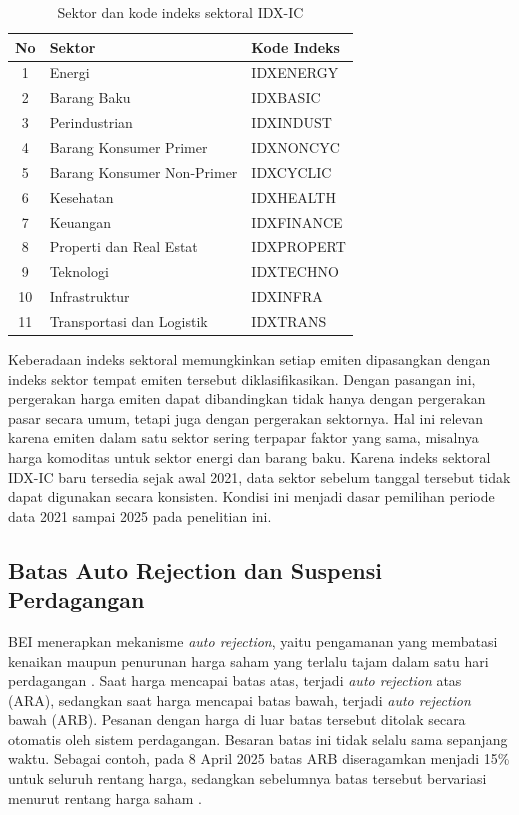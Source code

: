 \begin{table}[t]
  \centering
  \caption[Sektor dan kode indeks sektoral IDX-IC]{Sektor dan kode indeks sektoral IDX-IC \autocite{cnbc2021idxic}}
  \label{tab:sektor-idxic}
  \begin{tabular}{| c | l | l |}
    \hline
    \textbf{No} & \textbf{Sektor} & \textbf{Kode Indeks} \\
    \hline
    1  & Energi                        & IDXENERGY  \\
    2  & Barang Baku                   & IDXBASIC   \\
    3  & Perindustrian                 & IDXINDUST  \\
    4  & Barang Konsumer Primer        & IDXNONCYC  \\
    5  & Barang Konsumer Non-Primer    & IDXCYCLIC  \\
    6  & Kesehatan                     & IDXHEALTH  \\
    7  & Keuangan                      & IDXFINANCE \\
    8  & Properti dan Real Estat       & IDXPROPERT \\
    9  & Teknologi                     & IDXTECHNO  \\
    10 & Infrastruktur                 & IDXINFRA   \\
    11 & Transportasi dan Logistik     & IDXTRANS   \\
    \hline
  \end{tabular}
\end{table}

Keberadaan indeks sektoral memungkinkan setiap emiten dipasangkan dengan indeks sektor tempat emiten tersebut diklasifikasikan. Dengan pasangan ini, pergerakan harga emiten dapat dibandingkan tidak hanya dengan pergerakan pasar secara umum, tetapi juga dengan pergerakan sektornya. Hal ini relevan karena emiten dalam satu sektor sering terpapar faktor yang sama, misalnya harga komoditas untuk sektor energi dan barang baku. Karena indeks sektoral IDX-IC baru tersedia sejak awal 2021, data sektor sebelum tanggal tersebut tidak dapat digunakan secara konsisten. Kondisi ini menjadi dasar pemilihan periode data 2021 sampai 2025 pada penelitian ini.

\subsection{Batas Auto Rejection dan Suspensi Perdagangan}

BEI menerapkan mekanisme \emph{auto rejection}, yaitu pengamanan yang membatasi kenaikan maupun penurunan harga saham yang terlalu tajam dalam satu hari perdagangan \autocite{kompas2025arb}. Saat harga mencapai batas atas, terjadi \emph{auto rejection} atas (ARA), sedangkan saat harga mencapai batas bawah, terjadi \emph{auto rejection} bawah (ARB). Pesanan dengan harga di luar batas tersebut ditolak secara otomatis oleh sistem perdagangan. Besaran batas ini tidak selalu sama sepanjang waktu. Sebagai contoh, pada 8 April 2025 batas ARB diseragamkan menjadi 15\% untuk seluruh rentang harga, sedangkan sebelumnya batas tersebut bervariasi menurut rentang harga saham \autocite{kompas2025arb}.

